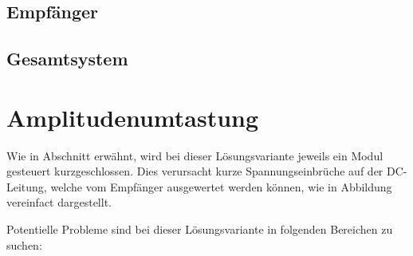 \subsection{Empf\"anger}
\label{sec:simu:fsk:inductive:receiver}

\subsection{Gesamtsystem}
\label{sec:simu:fsk:inductive:inductive}


\section{Amplitudenumtastung}
\label{sec:simu:ask}

Wie in Abschnitt  erw\"ahnt, wird bei dieser L\"osungsvariante
jeweils   ein   Modul   gesteuert   kurzgeschlossen. Dies   verursacht   kurze
Spannungseinbr\"uche auf  der DC-Leitung,  welche vom  Empf\"anger ausgewertet
werden k\"onnen, wie in Abbildung vereinfact dargestellt.

Potentielle Probleme sind bei  dieser L\"osungsvariante in folgenden Bereichen
zu suchen:

